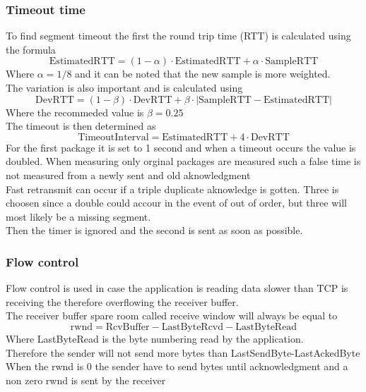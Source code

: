 \documentclass[12pt, a4paper]{article}
\begin{document}
			\subsubsection{Timeout time}
				To find segment timeout the first the round trip time (RTT) is calculated using the formula
				$$\text{EstimatedRTT}=(1-\alpha)\cdot \text{EstimatedRTT}+\alpha \cdot \text{SampleRTT}$$
				Where $\alpha=1/8$ and it can be noted that the new sample is more weighted.\\
				The variation is also important and is calculated using
				$$\text{DevRTT}=(1-\beta)\cdot \text{DevRTT}+\beta \cdot |\text{SampleRTT}-\text{EstimatedRTT}|$$
				Where the recommeded value is $\beta = 0.25$\\
				The timeout is then determined as
				$$\text{TimeoutInterval}=\text{EstimatedRTT}+4\cdot\text{DevRTT}$$
				For the first package it is set to 1 second and when a timeout occurs the value is doubled.
				When measuring only orginal packages are measured such a false time is not measured from a newly sent and old aknowledgment\\[4mm]
				Fast retransmit can occur if a triple duplicate aknowledge is gotten. Three is choosen since a double could accour in the event of out of order, but three will most likely be a missing segment.\\
				Then the timer is ignored and the second is sent as soon as possible.
			\subsubsection{Flow control}
				Flow control is used in case the application is reading data slower than TCP is receiving the therefore overflowing the receiver buffer.\\
				The receiver buffer spare room called receive window will always be equal to 
				$$\text{rwnd}=\text{RcvBuffer}-\text{LastByteRcvd}-\text{LastByteRead}$$
				Where LastByteRead is the byte numbering read by the application.\\
				Therefore the sender will not send more bytes than LastSendByte-LastAckedByte\\
				When the rwnd is 0 the sender have to send bytes until acknowledgment and a non zero rwnd is sent by the receiver
\end{document}
